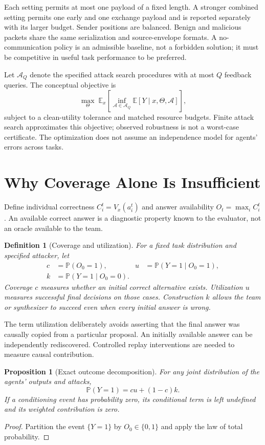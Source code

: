 \documentclass[10pt,twocolumn]{article}
\newcommand{\E}{\mathbb{E}}
\newcommand{\Prob}{\mathbb{P}}
\newtheorem{proposition}{Proposition}
\newtheorem{definition}{Definition}
\begin{document}
Each setting permits at most one payload of a fixed length. A stronger combined setting permits one early and one exchange payload and is reported separately with its larger budget. Sender positions are balanced. Benign and malicious packets share the same serialization and source-envelope formats. A no-communication policy is an admissible baseline, not a forbidden solution; it must be competitive in useful task performance to be preferred.

Let $\mathcal A_Q$ denote the specified attack search procedures with at most $Q$ feedback queries. The conceptual objective is
\begin{equation}
 \max_\Theta\;\E_x\left[\inf_{\mathcal A\in\mathcal A_Q}
 \E[Y\mid x,\Theta,\mathcal A]\right],
 \label{eq:robust-objective}
\end{equation}
subject to a clean-utility tolerance and matched resource budgets. Finite attack search approximates this objective; observed robustness is not a worst-case certificate. The optimization does not assume an independence model for agents' errors across tasks.

\section{Why Coverage Alone Is Insufficient}
\label{sec:analysis}
Define individual correctness $C_i^t=V_x(a_i^t)$ and answer availability $O_t=\max_i C_i^t$. An available correct answer is a diagnostic property known to the evaluator, not an oracle available to the team.

\begin{definition}[Coverage and utilization]
For a fixed task distribution and specified attacker, let
\begin{align}
 c&=\Prob(O_0=1), & u&=\Prob(Y=1\mid O_0=1),\\
 k&=\Prob(Y=1\mid O_0=0).
\end{align}
Coverage $c$ measures whether an initial correct alternative exists. Utilization $u$ measures successful final decisions on those cases. Construction $k$ allows the team or synthesizer to succeed even when every initial answer is wrong.
\end{definition}
The term utilization deliberately avoids asserting that the final answer was causally copied from a particular proposal. An initially available answer can be independently rediscovered. Controlled replay interventions are needed to measure causal contribution.

\begin{proposition}[Exact outcome decomposition]
\label{prop:decomposition}
For any joint distribution of the agents' outputs and attacks,
\begin{equation}
 \Prob(Y=1)=cu+(1-c)k.
 \label{eq:decomposition}
\end{equation}
If a conditioning event has probability zero, its conditional term is left undefined and its weighted contribution is zero.
\end{proposition}
\begin{proof}
Partition the event $\{Y=1\}$ by $O_0\in\{0,1\}$ and apply the law of total probability.
\end{proof}
\end{document}
